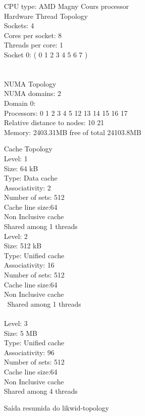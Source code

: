 \documentclass[12pt]{article}
\begin{document}
\begin{figure}[ht]\footnotesize
\begin{tt}
\begin{multicols}{2}
CPU type:	AMD Magny Cours processor\\
Hardware Thread Topology\\
Sockets:	4\\
Cores per socket:	8\\
Threads per core:	1\\
Socket 0: ( 0 1 2 3 4 5 6 7 )\\
\\
\\
NUMA Topology\\
NUMA domains: 2\\
Domain 0:\\
Processors: 0 1 2 3 4 5 12 13 14 15 16 17\\
Relative distance to nodes: 10 21\\
Memory: 2403.31MB free of total 24103.8MB\\
\end{multicols}
\begin{multicols}{3}
Cache Topology\\
Level:	1\\
Size:	64 kB\\
Type:	Data cache\\
Associativity:	2\\
Number of sets:	512\\
Cache line size:64\\
Non Inclusive cache\\
Shared among 1 threads\\
Level:	2\\
Size:	512 kB\\
Type:	Unified cache\\
Associativity:	16\\
Number of sets:	512\\
Cache line size:64\\
Non Inclusive cache\\\
Shared among 1 threads\\
\\
Level:	3\\
Size:	5 MB\\
Type:	Unified cache\\
Associativity:	96\\
Number of sets:	512\\
Cache line size:64\\
Non Inclusive cache\\
Shared among 4 threads\\
\end{multicols}\caption{Saída resumida do likwid-topology}\label{fig:topologyOut}
\end{tt}
\end{figure}
\end{document}

